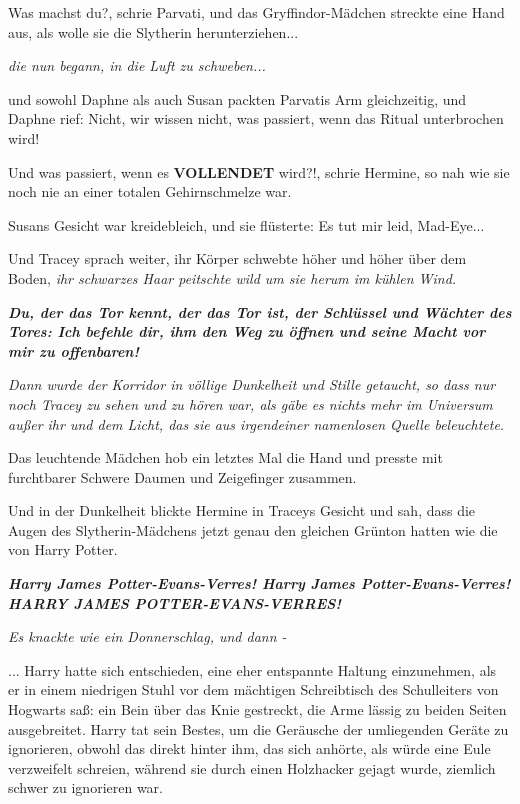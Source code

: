 \glqq{}Was machst du?\grqq{}, schrie Parvati, und das Gryffindor-Mädchen streckte
eine Hand aus, als wolle sie die Slytherin herunterziehen...

\emph{die nun begann, in die Luft zu schweben...}

und sowohl Daphne als auch Susan packten Parvatis Arm gleichzeitig, und Daphne
rief: \glqq{}Nicht, wir wissen nicht, was passiert, wenn das Ritual unterbrochen
wird!\grqq{}

\glqq{}Und was passiert, wenn es \textbf{VOLLENDET} wird?!\grqq{}, schrie
Hermine, so nah wie sie noch nie an einer totalen Gehirnschmelze war.

Susans Gesicht war kreidebleich, und sie flüsterte: \glqq{}Es tut mir leid,
Mad-Eye...\grqq{}

Und Tracey sprach weiter, ihr Körper schwebte höher und höher über dem
Boden,\emph{ ihr schwarzes Haar peitschte wild um sie herum im kühlen Wind.}

\glqq{}\textbf{\emph{Du, der das Tor kennt, der das Tor ist, der Schlüssel und
Wächter des Tores: Ich befehle dir, ihm den Weg zu öffnen und seine Macht vor
mir zu offenbaren!}}\grqq{}

\emph{Dann wurde der Korridor in völlige Dunkelheit und Stille getaucht, so dass
nur noch Tracey zu sehen und zu hören war, als gäbe es nichts mehr im Universum
außer ihr und dem Licht, das sie aus irgendeiner namenlosen Quelle beleuchtete}.

Das leuchtende Mädchen hob ein letztes Mal die Hand und presste mit furchtbarer
Schwere Daumen und Zeigefinger zusammen.

Und in der Dunkelheit blickte Hermine in Traceys Gesicht und sah, dass die Augen
des Slytherin-Mädchens jetzt genau den gleichen Grünton hatten wie die von Harry
Potter.

\glqq{}\textbf{\emph{Harry James Potter-Evans-Verres! Harry James
Potter-Evans-Verres! HARRY JAMES POTTER-EVANS-VERRES!}}\grqq{}

\emph{Es knackte wie ein Donnerschlag,
und dann -}

... Harry hatte sich entschieden, eine eher entspannte Haltung einzunehmen, als
er in einem niedrigen Stuhl vor dem mächtigen Schreibtisch des Schulleiters von
Hogwarts saß: ein Bein über das Knie gestreckt, die Arme lässig zu beiden Seiten
ausgebreitet. Harry tat sein Bestes, um die Geräusche der umliegenden Geräte zu
ignorieren, obwohl das direkt hinter ihm, das sich anhörte, als würde eine Eule
verzweifelt schreien, während sie durch einen Holzhacker gejagt wurde, ziemlich
schwer zu ignorieren war.

